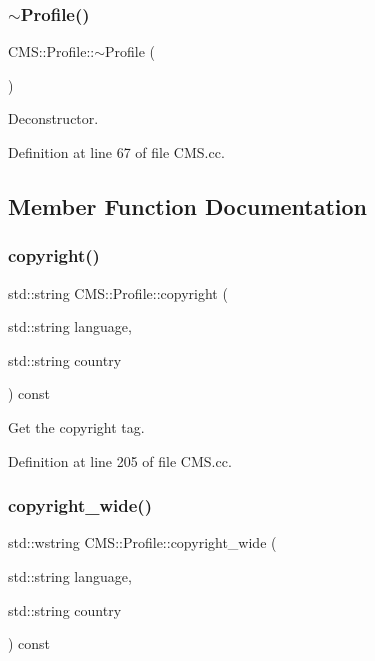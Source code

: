 \subsubsection{\texorpdfstring{$\sim$\+Profile()}{~Profile()}}
{\footnotesize\ttfamily C\+M\+S\+::\+Profile\+::$\sim$\+Profile (\begin{DoxyParamCaption}{ }\end{DoxyParamCaption})}



Deconstructor. 



Definition at line 67 of file C\+M\+S.\+cc.



\subsection{Member Function Documentation}
\mbox{\label{class_c_m_s_1_1_profile_aa0820c0bb156499d5597a7cf54a3ecc0}} 
\subsubsection{\texorpdfstring{copyright()}{copyright()}}
{\footnotesize\ttfamily std\+::string C\+M\+S\+::\+Profile\+::copyright (\begin{DoxyParamCaption}\item[{std\+::string}]{language,  }\item[{std\+::string}]{country }\end{DoxyParamCaption}) const}



Get the copyright tag. 



Definition at line 205 of file C\+M\+S.\+cc.

\mbox{\label{class_c_m_s_1_1_profile_a8ce6488b146cbffb1f14171c1b862a8b}} 
\subsubsection{\texorpdfstring{copyright\+\_\+wide()}{copyright\_wide()}}
{\footnotesize\ttfamily std\+::wstring C\+M\+S\+::\+Profile\+::copyright\+\_\+wide (\begin{DoxyParamCaption}\item[{std\+::string}]{language,  }\item[{std\+::string}]{country }\end{DoxyParamCaption}) const}



